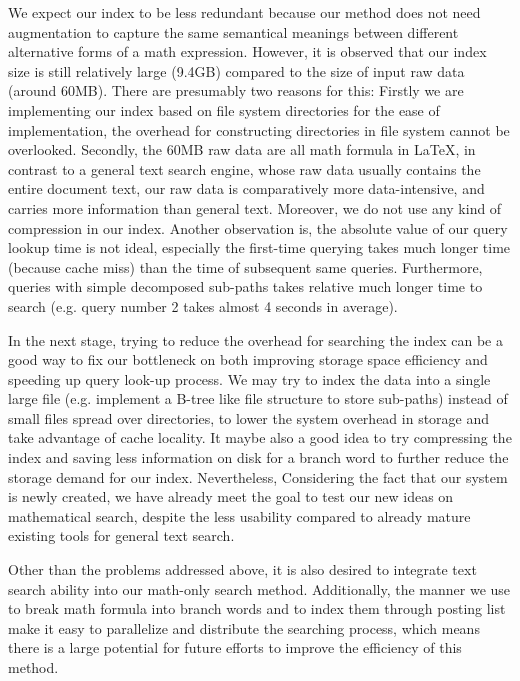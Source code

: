 We expect our index to be less redundant because our method does not need augmentation to capture the same semantical meanings between different alternative forms of a math expression.
However, it is observed that our index size is still relatively large (9.4GB) compared to the size of input raw data (around 60MB).
There are presumably two reasons for this: 
Firstly we are implementing our index based on file system directories for the ease of implementation, the overhead for constructing directories in file system cannot be overlooked. 
Secondly, the 60MB raw data are all math formula in \LaTeX,	in contrast to a general text search engine, whose raw data usually contains the entire document text, our raw data is comparatively more data-intensive, and carries more information than general text. 
Moreover, we do not use any kind of compression in our index.
Another observation is, the absolute value of our query lookup time is not ideal, especially
the first-time querying takes much longer time (because cache miss) than the time of subsequent same queries. 
Furthermore, queries with simple decomposed sub-paths takes relative much longer time to search (e.g. query number 2 takes almost 4 seconds in average). 

In the next stage, trying to reduce the overhead for searching the index can be a good way to fix our bottleneck on both improving storage space efficiency and speeding up query look-up process. 
We may try to index the data into a single large file (e.g. implement a B-tree like file structure to store sub-paths) instead of small files spread over directories, to lower the system overhead in storage and take advantage of cache locality. 
It maybe also a good idea to try compressing the index and saving less information on disk for a branch word to further reduce the storage demand for our index.
Nevertheless, Considering the fact that our system is newly created, we have already meet the goal to test our new ideas on mathematical search, despite the less usability compared to already mature existing tools for general text search.

Other than the problems addressed above, it is also desired to integrate text search ability into our math-only search method. 
Additionally, the manner we use to break math formula into branch words and to index them through posting list make it easy to parallelize and distribute the searching process,
which means there is a large potential for future efforts to improve the efficiency of this method.
